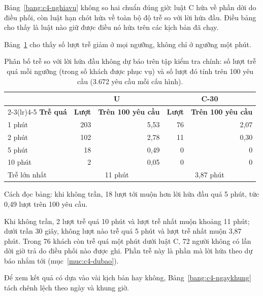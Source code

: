 Bảng~\ref{bang:c4-nghiavu} không so hai chuẩn đúng giờ: luật C hứa về phần dời do điều phối, còn luật
hạn chót hứa về toàn bộ độ trễ so với lời hứa đầu. Điều bảng cho thấy là luật nào giữ được điều nó hứa
trên các kịch bản đã chạy.

Bảng~\ref{bang:c4-phanbotre} cho thấy số lượt trễ giảm ở mọi ngưỡng, không chỉ ở ngưỡng một phút.

\begin{table}[htbp]
\centering
\caption{Phân bố trễ so với lời hứa đầu không dự báo trên tập kiểm tra chính: số lượt trễ quá mỗi ngưỡng
(trong số khách được phục vụ) và số lượt đó tính trên 100 yêu cầu (3.672 yêu cầu mỗi cấu hình).}
\label{bang:c4-phanbotre}
\small
\begin{tabular}{@{}lrrrr@{}}
\toprule
& \multicolumn{2}{c}{\textbf{U}} & \multicolumn{2}{c}{\textbf{C-30}}\\
\cmidrule(lr){2-3}\cmidrule(lr){4-5}
\textbf{Trễ quá} & \textbf{Lượt} & \textbf{Trên 100 yêu cầu} & \textbf{Lượt} & \textbf{Trên 100 yêu cầu}\\
\midrule
1 phút & 203 & 5,53 & 76 & 2,07\\
2 phút & 102 & 2,78 & 11 & 0,30\\
5 phút & 18 & 0,49 & 0 & 0\\
10 phút & 2 & 0,05 & 0 & 0\\
\midrule
Trễ lớn nhất & \multicolumn{2}{c}{11 phút} & \multicolumn{2}{c}{3,87 phút}\\
\bottomrule
\end{tabular}
\end{table}

Cách đọc bảng: khi không trần, 18 lượt tới muộn hơn lời hứa đầu quá 5 phút, tức 0,49 lượt trên 100 yêu
cầu.

Khi không trần, 2 lượt trễ quá 10 phút và lượt trễ nhất muộn khoảng 11 phút; dưới trần 30 giây, không
lượt nào trễ quá 5 phút và lượt trễ nhất muộn 3,87 phút. Trong 76 khách còn trễ quá một phút dưới luật C,
72 người không có lần dời giờ trả do điều phối nào được ghi. Phần trễ này là phần mà lời hứa theo dự báo
nhắm tới (mục~\ref{muc:c4-dubao}).

Để xem kết quả có dựa vào vài kịch bản hay không, Bảng~\ref{bang:c4-ngaykhung} tách chênh lệch theo ngày
và khung giờ.

